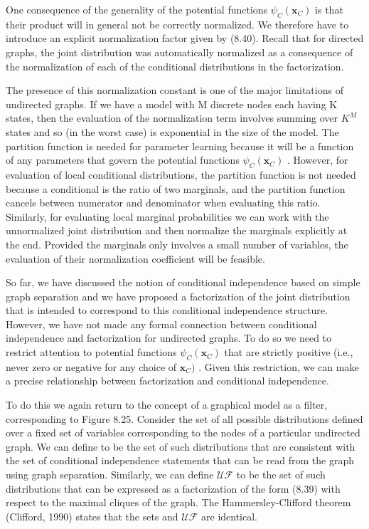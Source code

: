 \documentclass[
  10
]{article}
\begin{document}
One consequence of the generality of the potential functions
\(\psi _ { C } ( \mathbf { x } _ { C } )\) is that their product will in
general not be correctly normalized. We therefore have to introduce an
explicit normalization factor given by (8.40). Recall that for directed
graphs, the joint distribution was automatically normalized as a
consequence of the normalization of each of the conditional
distributions in the factorization.

The presence of this normalization constant is one of the major
limitations of undirected graphs. If we have a model with M discrete
nodes each having K states, then the evaluation of the normalization
term involves summing over \(K ^ { M }\) states and so (in the worst
case) is exponential in the size of the model. The partition function is
needed for parameter learning because it will be a function of any
parameters that govern the potential functions
\(\psi _ { C } ( \mathbf { x } _ { C } )\) . However, for evaluation of
local conditional distributions, the partition function is not needed
because a conditional is the ratio of two marginals, and the partition
function cancels between numerator and denominator when evaluating this
ratio. Similarly, for evaluating local marginal probabilities we can
work with the unnormalized joint distribution and then normalize the
marginals explicitly at the end. Provided the marginals only involves a
small number of variables, the evaluation of their normalization
coefficient will be feasible.

So far, we have discussed the notion of conditional independence based
on simple graph separation and we have proposed a factorization of the
joint distribution that is intended to correspond to this conditional
independence structure. However, we have not made any formal connection
between conditional independence and factorization for undirected
graphs. To do so we need to restrict attention to potential functions
\(\psi _ { C } ( \mathbf { x } _ { C } )\) that are strictly positive
(i.e., never zero or negative for any choice of
\(\mathbf { x } _ { C } )\) . Given this restriction, we can make a
precise relationship between factorization and conditional independence.

To do this we again return to the concept of a graphical model as a
filter, corresponding to Figure 8.25. Consider the set of all possible
distributions defined over a fixed set of variables corresponding to the
nodes of a particular undirected graph. We can define to be the set of
such distributions that are consistent with the set of conditional
independence statements that can be read from the graph using graph
separation. Similarly, we can define \(\mathcal { U F }\) to be the set
of such distributions that can be expressed as a factorization of the
form (8.39) with respect to the maximal cliques of the graph. The
Hammersley-Clifford theorem (Clifford, 1990) states that the sets and
\(\mathcal { U F }\) are identical.
\end{document}
